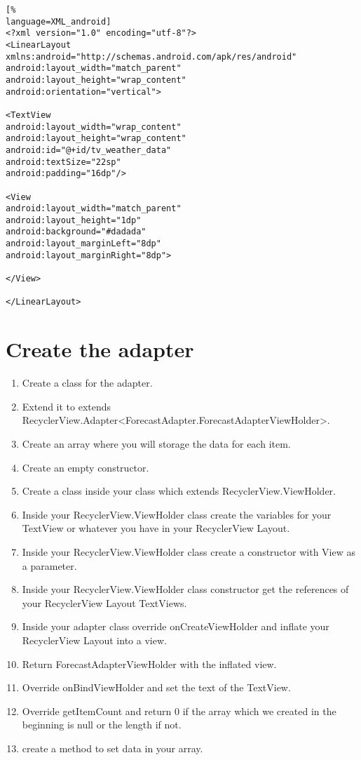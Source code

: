 \documentclass[12pt]{article} %
\begin{document}
\begin{lstlisting}[%
language=XML_android]
<?xml version="1.0" encoding="utf-8"?>
<LinearLayout xmlns:android="http://schemas.android.com/apk/res/android"
android:layout_width="match_parent"
android:layout_height="wrap_content"
android:orientation="vertical">

<TextView
android:layout_width="wrap_content"
android:layout_height="wrap_content"
android:id="@+id/tv_weather_data"
android:textSize="22sp"
android:padding="16dp"/>

<View
android:layout_width="match_parent"
android:layout_height="1dp"
android:background="#dadada"
android:layout_marginLeft="8dp"
android:layout_marginRight="8dp">

</View>

</LinearLayout>
\end{lstlisting}

\section{Create the adapter}

\begin{enumerate}
	\item Create a class for the adapter.
	\item Extend it to extends RecyclerView.Adapter<ForecastAdapter.ForecastAdapterViewHolder>.
	\item Create an array where you will storage the data for each item.
	\item Create an empty constructor.
	\item Create a class inside your class which extends RecyclerView.ViewHolder.
	\item Inside your RecyclerView.ViewHolder class create the variables for your TextView or whatever you have in your RecyclerView Layout.
	\item Inside your RecyclerView.ViewHolder class create a constructor with View as a parameter.
	\item Inside your RecyclerView.ViewHolder class constructor get the references of your RecyclerView Layout TextViews.
	\item Inside your adapter class override onCreateViewHolder and inflate your RecyclerView Layout into a view.
	\item Return ForecastAdapterViewHolder with the inflated view.
	\item Override onBindViewHolder and set the text of the TextView.
	\item Override getItemCount and return 0 if the array which we created in the beginning is null or the length if not.
	\item create a method to set data in your array.
\end{enumerate}
\end{document}
